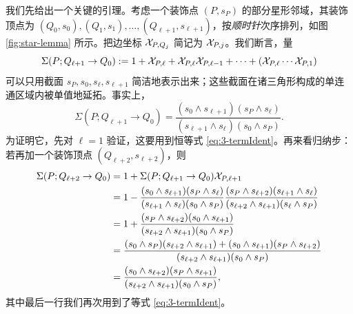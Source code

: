
我们先给出一个关键的引理。考虑一个装饰点 $(P,s_P)$ 的部分星形邻域，其装饰顶点为 $(Q_0,s_0),(Q_1,s_1),\dots,(Q_{\ell+1},s_{\ell+1})$，按\emph{顺时针}次序排列，如图 \ref{fig:star-lemma} 所示。把边坐标 $\mathcal{X}_{P,Q_j}$ 简记为 $\mathcal{X}_{P,j}$。我们断言，量
\begin{equation}\label{eq:def-sigma}
\Sigma(P;Q_{\ell+1}\to Q_0):=1+\mathcal{X}_{P,\ell}+\mathcal{X}_{P,\ell}\mathcal{X}_{P,\ell-1}+\cdots+(\mathcal{X}_{P,\ell}\cdots\mathcal{X}_{P,1})
\end{equation}
可以只用截面 $s_P,s_0,s_\ell,s_{\ell+1}$ 简洁地表示出来；这些截面在诸三角形构成的单连通区域内被单值地延拓。事实上，
\begin{equation}\label{eq:key-star-lemma}
\Sigma(P;Q_{\ell+1}\to Q_0)=\frac{(s_0\wedge s_{\ell+1})(s_P\wedge s_\ell)}{(s_{\ell+1}\wedge s_\ell)(s_0\wedge s_P)}.
\end{equation}
为证明它，先对 $\ell=1$ 验证，这要用到恒等式 \eqref{eq:3-termIdent}。再来看归纳步：若再加一个装饰顶点 $(Q_{\ell+2},s_{\ell+2})$，则
\begin{equation}
\begin{split}
\Sigma(P;Q_{\ell+2}\to Q_0)&=1+\Sigma(P;Q_{\ell+1}\to Q_0)\mathcal{X}_{P,\ell+1}\\
&=1-\frac{(s_0\wedge s_{\ell+1})(s_P\wedge s_\ell)}{(s_{\ell+1}\wedge s_\ell)(s_0\wedge s_P)}\frac{(s_P\wedge s_{\ell+2})(s_{\ell+1}\wedge s_\ell)}{(s_{\ell+2}\wedge s_{\ell+1})(s_\ell\wedge s_P)}\\
&=1+\frac{(s_P\wedge s_{\ell+2})(s_0\wedge s_{\ell+1})}{(s_{\ell+2}\wedge s_{\ell+1})(s_0\wedge s_P)}\\
&=\frac{(s_0\wedge s_P)(s_{\ell+2}\wedge s_{\ell+1})+(s_0\wedge s_{\ell+1})(s_P\wedge s_{\ell+2})}{(s_{\ell+2}\wedge s_{\ell+1})(s_0\wedge s_P)}\\
&=\frac{(s_0\wedge s_{\ell+2})(s_P\wedge s_{\ell+1})}{(s_{\ell+2}\wedge s_{\ell+1})(s_0\wedge s_P)},
\end{split}
\end{equation}
其中最后一行我们再次用到了等式 \eqref{eq:3-termIdent}。


